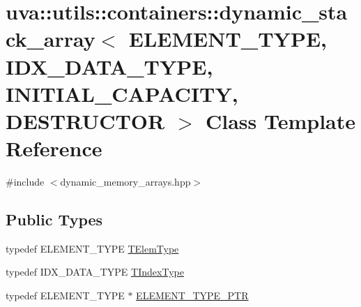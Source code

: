 \hypertarget{classuva_1_1utils_1_1containers_1_1dynamic__stack__array}{}\section{uva\+:\+:utils\+:\+:containers\+:\+:dynamic\+\_\+stack\+\_\+array$<$ E\+L\+E\+M\+E\+N\+T\+\_\+\+T\+Y\+P\+E, I\+D\+X\+\_\+\+D\+A\+T\+A\+\_\+\+T\+Y\+P\+E, I\+N\+I\+T\+I\+A\+L\+\_\+\+C\+A\+P\+A\+C\+I\+T\+Y, D\+E\+S\+T\+R\+U\+C\+T\+O\+R $>$ Class Template Reference}
\label{classuva_1_1utils_1_1containers_1_1dynamic__stack__array}


{\ttfamily \#include $<$dynamic\+\_\+memory\+\_\+arrays.\+hpp$>$}

\subsection*{Public Types}
\begin{DoxyCompactItemize}
\item 
typedef E\+L\+E\+M\+E\+N\+T\+\_\+\+T\+Y\+P\+E \hyperlink{classuva_1_1utils_1_1containers_1_1dynamic__stack__array_a28bc953e0b84129b26badd8de1c7708f}{T\+Elem\+Type}
\item 
typedef I\+D\+X\+\_\+\+D\+A\+T\+A\+\_\+\+T\+Y\+P\+E \hyperlink{classuva_1_1utils_1_1containers_1_1dynamic__stack__array_af11e2fba505f2b4c1ddf9babf9a1063c}{T\+Index\+Type}
\item 
typedef E\+L\+E\+M\+E\+N\+T\+\_\+\+T\+Y\+P\+E $\ast$ \hyperlink{classuva_1_1utils_1_1containers_1_1dynamic__stack__array_ab1324861137e6dafb483cb53967f439b}{E\+L\+E\+M\+E\+N\+T\+\_\+\+T\+Y\+P\+E\+\_\+\+P\+T\+R}
\end{DoxyCompactItemize}
